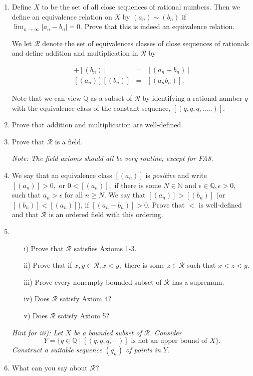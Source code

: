 \documentclass[openany, amssymb, psamsfonts]{amsart}
\newcommand{\bbN}{\mathbb{N}}
\newcommand{\bbQ}{\mathbb{Q}}
\theoremstyle{definition}
\numberwithin{equation}{section}
\begin{document}
\begin{enumerate}
\begin{enumerate}
\item  Define $X$ to be the set of all close sequences of rational numbers. Then we define an equivalence relation on $X$ by 
$(a_n)\sim (b_n)$ if $\displaystyle \lim_{n\longrightarrow \infty}|a_n-b_n|=0$.  Prove that this is indeed an equivalence relation.





We let ${\mathcal R}$ denote the set of equivalences classes of close sequences of rationals and define addition and multiplication in ${\mathcal R}$ by

\begin{eqnarray*}
[(a_n)]+[(b_n)] & = & [(a_n+b_n)] \\
{ } [(a_n)] [(b_n)] & = & [(a_n b_n)].
\end{eqnarray*}



Note that we can view $\bbQ$ as a subset of ${\mathcal R}$ by identifying a rational number $q$ with the equivalence class of the constant sequence, $[(q,q,q,.....)].$

\item Prove that addition and multiplication are well-defined.

\item
Prove that ${\mathcal R}$ is a field.

{\it Note: The field axioms should all be very routine, except for FA8.}
\item
We say that an equivalence class $[(a_n)]$ is {\em positive} and write $[(a_n)]>0,$ or $0<[(a_n)],$  if there is some $N\in\bbN$ and $\epsilon\in\bbQ,\epsilon>0,$ such that $a_n>\epsilon$ for all $n\geq N.$ We say that $[(a_n)]>[(b_n)]$ (or $[(b_n)]<[(a_n)]$),  if $[(a_n-b_n)]>0.$  Prove that $<$ is well-defined and that ${\mathcal R}$ is an ordered field with this ordering.

\item 
\begin{enumerate}
\item[i)] Prove that ${\mathcal R}$ satisfies Axioms 1-3. 
\item[ii)] Prove that if $x,y\in {\mathcal R}, x<y,$ there is some $z\in {\mathcal R}$ such that $x<z<y.$ 
\item[iii)] Prove every nonempty bounded subset of ${\mathcal R}$ has a supremum.
\item[iv)] Does ${\mathcal R}$ satisfy Axiom 4?
\item[v)] Does ${\mathcal R}$ satisfy Axiom 5?
\end{enumerate}

{\em Hint for iii): Let $X$ be a bounded subset of ${\mathcal R}.$ Consider 
$$Y=\{q\in\bbQ\mid [(q,q,q,\cdots)]\text{ is not an upper bound of }X\}.$$ 
Construct a suitable sequence $(q_n)$ of points in $Y.$  }


\item 
What can you say about ${\mathcal R}$?
\end{enumerate}
\end{enumerate}
\end{document}
